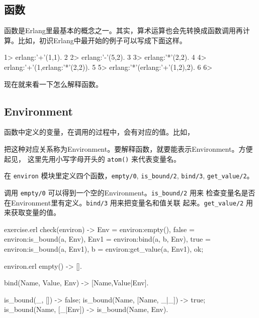 \documentclass[preview,multi,crop=false,border=1in,class=memoir]{standalone}
\begin{document}
\begin{preview-page}
\section{函数}

函数是Erlang里最基本的概念之一。其实，算术运算也会先转换成函数调用再计
算。比如，初识Erlang中最开始的例子可以写成下面这样。

\begin{ErlangShellSession}
1> erlang:'+'(1,1).
2
2> erlang:'-'(5,2).
3
3> erlang:'*'(2,2).
4
4> erlang:'+'(1,erlang:'*'(2,2)).
5
5> erlang:'*'(erlang:'+'(1,2),2).
6
6>
\end{ErlangShellSession}


现在就来看一下怎么解释函数。


\subsection{Environment}

函数中定义的变量，在调用的过程中，会有对应的值。比如，



把这种对应关系称为Environment。要解释函数，就要能表示Environment。方便起见，
这里先用小写字母开头的 \verb|atom()| 来代表变量名。

\begin{Exercise}[title={environ},difficulty=2]
在 \verb|environ| 模块里定义四个函数，\verb|empty/0|, \verb|is_bound/2|,
\verb|bind/3|, \verb|get_value/2|。

调用 \verb|empty/0| 可以得到一个空的Environment。\verb|is_bound/2| 用来
检查变量名是否在Environment里有定义。\verb|bind/3| 用来把变量名和值关联
起来。\verb|get_value/2| 用来获取变量的值。

\begin{SourceCode}[5][11]{exercise.erl}
check(environ) ->
    Env = environ:empty(),
    false = environ:is_bound(a, Env),
    Env1 = environ:bind(a, b, Env),
    true = environ:is_bound(a, Env1),
    b = environ:get_value(a, Env1),
    ok;
\end{SourceCode}
\end{Exercise}

\begin{Answer}
\begin{SourceCode}[6]{environ.erl}
empty() ->
    [].

bind(Name, Value, Env) ->
    [{Name,Value}|Env].

is_bound(_, []) ->
    false;
is_bound(Name, [{Name, _}|_]) ->
    true;
is_bound(Name, [_|Env]) ->
    is_bound(Name, Env).


\end{SourceCode}
\end{Answer}
\end{preview-page}
\end{document}
